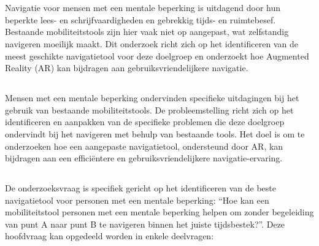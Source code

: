 \chapter{}%
\label{ch:inleiding}
Navigatie voor mensen met een mentale beperking is uitdagend door hun beperkte lees- en schrijfvaardigheden en gebrekkig tijds- en ruimtebesef. Bestaande mobiliteitstools zijn hier vaak niet op aangepast, wat zelfstandig navigeren moeilijk maakt. Dit onderzoek richt zich op het identificeren van de meest geschikte navigatietool voor deze doelgroep en onderzoekt hoe Augmented Reality (AR) kan bijdragen aan gebruiksvriendelijkere navigatie.

\section{}%
\label{sec:probleemstelling}

Mensen met een mentale beperking ondervinden specifieke uitdagingen bij het gebruik van bestaande mobiliteitstools. De probleemstelling richt zich op het identificeren en aanpakken van de specifieke problemen die deze doelgroep ondervindt bij het navigeren met behulp van bestaande tools. Het doel is om te onderzoeken hoe een aangepaste navigatietool, ondersteund door AR, kan bijdragen aan een efficiëntere en gebruiksvriendelijkere navigatie-ervaring.

\section{}%
\label{sec:onderzoeksvraag}

De onderzoeksvraag is specifiek gericht op het identificeren van de beste navigatietool voor personen met een mentale beperking: ``Hoe kan een mobiliteitstool personen met een mentale beperking helpen om zonder begeleiding van punt A naar punt B te navigeren binnen het juiste tijdsbestek?''. Deze hoofdvraag kan opgedeeld worden in enkele deelvragen:


